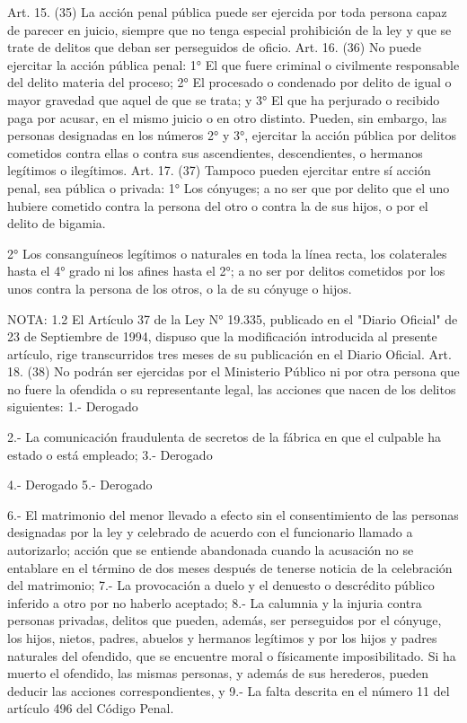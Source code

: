     Art. 15. (35) La acción penal pública puede ser ejercida por toda persona capaz de parecer en juicio, siempre que no tenga especial prohibición de la ley y que se trate de delitos que deban ser perseguidos de oficio.
    Art. 16. (36) No puede ejercitar la acción pública penal:
    1° El que fuere criminal o civilmente responsable del delito materia del proceso;
    2° El procesado o condenado por delito de igual o mayor gravedad que aquel de que se trata; y
    3° El que ha perjurado o recibido paga por acusar, en el mismo juicio o en otro distinto.
    Pueden, sin embargo, las personas designadas en los números 2° y 3°, ejercitar la acción pública por delitos cometidos contra ellas o contra sus ascendientes, descendientes, o hermanos legítimos o ilegítimos.
    Art. 17. (37) Tampoco pueden ejercitar entre sí acción penal, sea pública o privada:
    1° Los cónyuges; a no ser que por delito que el uno hubiere cometido contra la persona del otro o contra la de sus hijos, o por el delito de bigamia.

    2° Los consanguíneos legítimos o naturales en toda la línea recta, los colaterales hasta el 4° grado ni los afines hasta el 2°; a no ser por delitos cometidos por los unos contra la persona de los otros, o la de su cónyuge o hijos.

NOTA:  1.2
    El Artículo 37 de la Ley N° 19.335, publicado en el "Diario Oficial" de 23 de Septiembre de 1994, dispuso que la modificación introducida al presente artículo, rige transcurridos tres meses de su publicación en el Diario Oficial.
    Art. 18. (38) No podrán ser ejercidas por el Ministerio Público ni por otra persona que no fuere la ofendida o su representante legal, las acciones que nacen de los delitos siguientes:
    1.- Derogado

    2.- La comunicación fraudulenta de secretos de la fábrica en que el culpable ha estado o está empleado;
    3.- Derogado

    4.- Derogado
    5.- Derogado

    6.- El matrimonio del menor llevado a efecto sin el consentimiento de las personas designadas por la ley y celebrado de acuerdo con el funcionario llamado a autorizarlo; acción que se entiende abandonada cuando la acusación no se entablare en el término de dos meses después de tenerse noticia de la celebración del matrimonio;
    7.- La provocación a duelo y el denuesto o descrédito público inferido a otro por no haberlo aceptado;
    8.- La calumnia y la injuria contra personas privadas, delitos que pueden, además, ser perseguidos por el cónyuge, los hijos, nietos, padres, abuelos y hermanos legítimos y por los hijos y padres naturales del ofendido, que se encuentre moral o físicamente imposibilitado.  Si ha muerto el ofendido, las mismas personas, y además de sus herederos, pueden deducir las acciones correspondientes, y
    9.- La falta descrita en el número 11 del artículo 496 del Código Penal.

